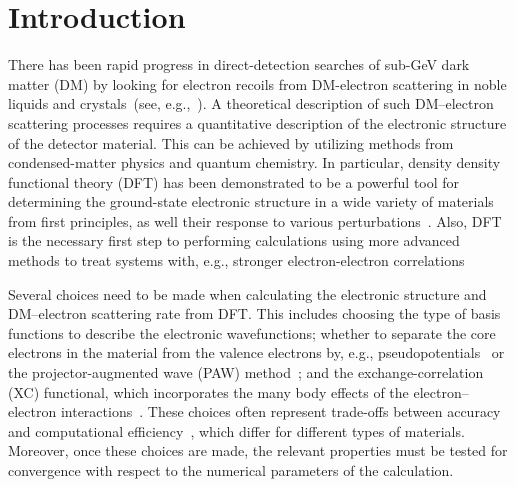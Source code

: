 \documentclass[
    prd, twocolumn, superscriptaddress, nofootinbib, amsmath, amssymb,
    aps, floatfix,preprintnumbers
]{revtex4-2}
\begin{document}
\maketitle

\section{Introduction}

    There has been rapid progress in direct-detection searches of sub-GeV dark matter (DM) by looking for electron recoils from DM-electron scattering in noble liquids and crystals~(see, e.g.,~\cite{Essig:2011nj,Essig:2012yx,Essig:2017kqs,Angle:2011th,Essig:2015cda, Lee:2015qva,Crisler:2018gci,sensei2019, SENSEI2020, DAMIC2020, Agnese:2018col,Aguilar-Arevalo:2019wdi,Arnaud:2020svb,Agnes:2018oej,Aprile:2016wwo,Aprile:2019xxb,XENON:2021qze,PandaX-II:2021nsg,Blanco:2019lrf,DAMIC-M:2022aks, SuperCDMS2020,XENON1T2020,Tiffenberg:2017aac,Settimo:2018qcm,Castello-Mor:2020jhd,oscuraExperiment}). A theoretical description of such DM--electron scattering processes requires a quantitative description of the electronic structure of the detector material. This can be achieved by utilizing methods from condensed-matter physics and quantum chemistry. In particular, density density functional theory (DFT) has been demonstrated to be a powerful tool for determining the ground-state electronic structure in a wide variety of materials from first principles, as well their response to various perturbations~\citep{Martin2020}. Also, DFT is the necessary first step to performing calculations using more advanced methods to treat systems with, e.g., stronger electron-electron correlations~\cite{Martin2016}
    
    Several choices need to be made when calculating the electronic structure and DM--electron scattering rate from DFT.  This includes choosing the type of basis functions to describe the electronic wavefunctions; whether to separate the core electrons in the material from  the valence electrons by, e.g., pseudopotentials~\cite{Martin2020} or the projector-augmented wave (PAW) method~\cite{PAW}; and the exchange-correlation (XC) functional, which incorporates the many body effects of the electron--electron interactions~\cite{KohnSham65,Martin2020}. These choices often represent trade-offs between accuracy and computational efficiency~\cite{dick21}, which differ for different types of materials. Moreover, once these choices are made, the relevant properties must be tested for convergence with respect to the numerical parameters of the calculation.
    
\end{document}
